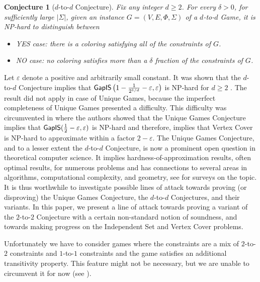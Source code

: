 \documentclass{toc}
\newtheorem{rconj}[theorem]{Conjecture}
\newcommand\eps{\varepsilon}
\begin{document}
%
\begin{rconj}[$d$-to-$d$ Conjecture] \label{conj:d-to-d}
Fix any integer $d \geqslant 2$.
For every %
$\delta>0$, for sufficiently large
%
$|\Sigma|$,  given an instance $G=(V,E,\Phi,\Sigma)$ of a $d$-to-$d$ Game, it is NP-hard
to distinguish between
\begin{itemize}
\item YES case: there is a coloring satisfying all of the constraints of $G$.
\item NO case: no coloring satisfies more than
a %
$\delta$ fraction of the constraints of $G$.
\end{itemize}
\end{rconj}

Let $\eps$ denote a positive and arbitrarily small constant.
It was shown that the $d$-to-$d$ Conjecture implies that ${\sf GapIS} \left(1-\frac{1}{2^{1/d}}-\eps, \eps\right)$ is NP-hard for $d \geqslant 2$ \cite{Khot02}. The result did not
apply in  case of Unique Games,
because the imperfect completeness of Unique Games presented a difficulty.
This difficulty was circumvented in \cite{KR08} where the
authors showed that the Unique Games Conjecture implies that ${\sf GapIS} (\frac{1}{2}-\eps, \eps)$ is NP-hard and therefore, implies that Vertex Cover is NP-hard to approximate
 within a factor $2-\eps$.
The Unique Games Conjecture, and to a lesser extent the $d$-to-$d$ Conjecture, is now a prominent open question in theoretical computer science.
It implies hardness-of-approximation results, often optimal results, for numerous problems and has connections to several areas in algorithms, computational complexity,
and geometry, see \cite{Trevisan-survey, KhotUGC-survey, KhotICM-survey} for surveys on the topic.  It is thus worthwhile to investigate possible lines of attack towards
proving (or disproving) the Unique Games Conjecture, the $d$-to-$d$ Conjectures,
and their variants. In this paper, we
present a line of attack towards proving a variant of the
 $2$-to-$2$  Conjecture with a certain non-standard notion of soundness,
and towards making progress
on the Independent Set and Vertex Cover problems.



Unfortunately we have to consider games where the constraints are a mix of $2$-to-$2$ constraints and $1$-to-$1$ constraints and
the
game satisfies an additional transitivity property. This feature might not be necessary, but we are unable to circumvent it for now
(see ).
\end{document}
